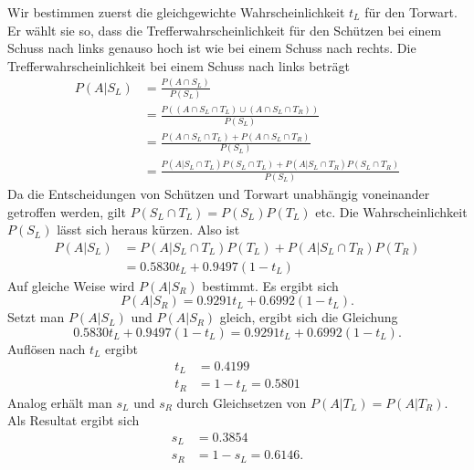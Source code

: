 \begin{Answer}
Wir bestimmen zuerst die gleichgewichte Wahrscheinlichkeit $t_L$ für den Torwart. Er wählt sie so, dass die Trefferwahrscheinlichkeit für den Schützen bei einem Schuss nach links genauso hoch ist wie bei einem Schuss nach rechts. Die Trefferwahrscheinlichkeit bei einem Schuss nach links beträgt
\begin{align*}
P(A|S_L)&=\frac{P(A\cap S_L)}{P(S_L)}\\
&=\frac{P((A\cap S_L\cap T_L)\cup (A\cap S_L\cap T_R))}{P(S_L)}\\
&=\frac{P(A\cap S_L\cap T_L)+P(A\cap S_L\cap T_R)}{P(S_L)}\\
&=\frac{P(A|S_L\cap T_L)P(S_L\cap T_L)+P(A|S_L\cap T_R)P(S_L\cap T_R)}{P(S_L)}
\end{align*}
Da die Entscheidungen von Schützen und Torwart unabhängig voneinander getroffen werden, gilt $P(S_L\cap T_L)=P(S_L)P(T_L)$ etc. Die Wahrscheinlichkeit $P(S_L)$ lässt sich heraus kürzen. Also ist
\begin{align*}
P(A|S_L)&=P(A|S_L\cap T_L)P(T_L)+P(A|S_L\cap T_R)P(T_R)\\
&= 0.5830 t_L+0.9497 (1-t_L)
\end{align*}
Auf gleiche Weise wird $P(A|S_R)$ bestimmt. Es ergibt sich
\[
P(A|S_R)=0.9291 t_L+0.6992 (1-t_L).
\]
Setzt man $P(A|S_L)$ und $P(A|S_R)$ gleich, ergibt sich die Gleichung
\[
0.5830 t_L+0.9497 (1-t_L)=0.9291 t_L+0.6992 (1-t_L).
\]
Auf\/lösen nach $t_L$ ergibt
\begin{align*}
t_L &= 0.4199\\
t_R &= 1-t_L= 0.5801
\end{align*}
Analog erhält man $s_L$ und $s_R$ durch Gleichsetzen von
$P(A|T_L)=P(A|T_R)$. Als Resultat ergibt sich
\begin{align*}
s_L &= 0.3854\\
s_R &= 1-s_L= 0.6146.
\end{align*}
\end{Answer}


